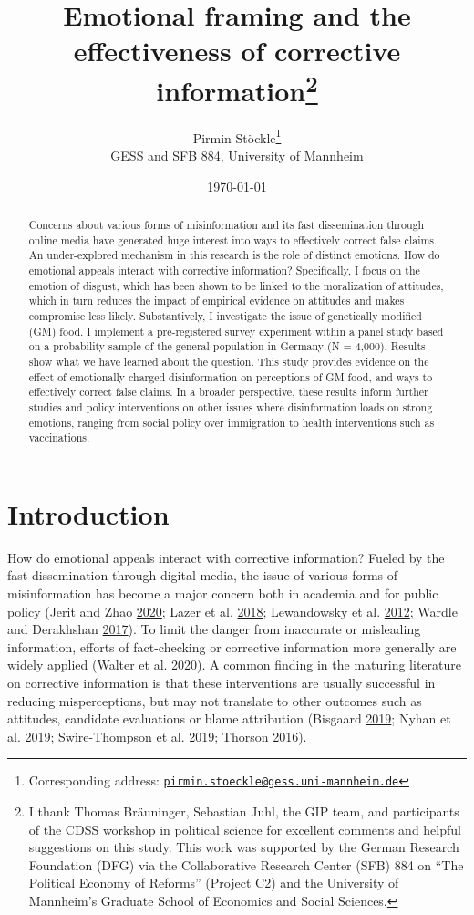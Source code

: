 \documentclass[
  12pt,
]{article}
\title{Emotional framing and the effectiveness of corrective information\footnote{I thank Thomas Bräuninger, Sebastian Juhl, the GIP team, and participants of the CDSS workshop in political science for excellent comments and helpful suggestions on this study. This work was supported by the German Research Foundation (DFG) via the Collaborative Research Center (SFB) 884 on ``The Political Economy of Reforms'' (Project C2) and the University of Mannheim's Graduate School of Economics and Social Sciences.}}
\author{Pirmin Stöckle\footnote{Corresponding address: \href{mailto:pirmin.stoeckle@gess.uni-mannheim.de}{\nolinkurl{pirmin.stoeckle@gess.uni-mannheim.de}}}\\
GESS and SFB 884, University of Mannheim}
\date{\today}
\begin{document}
\maketitle
\begin{abstract}
 \noindent Concerns about various forms of misinformation and its fast dissemination through online media have generated huge interest into ways to effectively correct false claims. An under-explored mechanism in this research is the role of distinct emotions. How do emotional appeals interact with corrective information? Specifically, I focus on the emotion of disgust, which has been shown to be linked to the moralization of attitudes, which in turn reduces the impact of empirical evidence on attitudes and makes compromise less likely. Substantively, I investigate the issue of genetically modified (GM) food. I implement a pre-registered survey experiment within a panel study based on a probability sample of the general population in Germany (N = 4,000). Results show what we have learned about the question. This study provides evidence on the effect of emotionally charged disinformation on perceptions of GM food, and ways to effectively correct false claims. In a broader perspective, these results inform further studies and policy interventions on other issues where disinformation loads on strong emotions, ranging from social policy over immigration to health interventions such as vaccinations. \vspace{.8cm}
\end{abstract}

\newpage

\hypertarget{introduction}{%
\section{Introduction}\label{introduction}}

How do emotional appeals interact with corrective information?
Fueled by the fast dissemination through digital media, the issue of various forms of misinformation has become a major concern both in academia and for public policy (Jerit and Zhao \protect\hyperlink{ref-jerit2020political}{2020}; Lazer et al. \protect\hyperlink{ref-lazer2018science}{2018}; Lewandowsky et al. \protect\hyperlink{ref-lewandowsky2012misinformation}{2012}; Wardle and Derakhshan \protect\hyperlink{ref-wardle2017information}{2017}).
To limit the danger from inaccurate or misleading information, efforts of fact-checking or corrective information more generally are widely applied (Walter et al. \protect\hyperlink{ref-walter2020fact}{2020}). A common finding in the maturing literature on corrective information is that these interventions are usually successful in reducing misperceptions, but may not translate to other outcomes such as attitudes, candidate evaluations or blame attribution (Bisgaard \protect\hyperlink{ref-bisgaard2019getting}{2019}; Nyhan et al. \protect\hyperlink{ref-nyhan2019taking}{2019}; Swire-Thompson et al. \protect\hyperlink{ref-swire2019they}{2019}; Thorson \protect\hyperlink{ref-thorson2016belief}{2016}).
\end{document}
